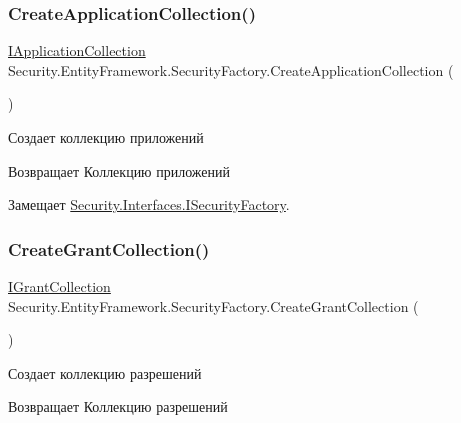 \subsubsection{\texorpdfstring{Create\+Application\+Collection()}{CreateApplicationCollection()}}
{\footnotesize\ttfamily \hyperlink{interface_security_1_1_interfaces_1_1_collections_1_1_i_application_collection}{I\+Application\+Collection} Security.\+Entity\+Framework.\+Security\+Factory.\+Create\+Application\+Collection (\begin{DoxyParamCaption}{ }\end{DoxyParamCaption})}



Создает коллекцию приложений 

\begin{DoxyReturn}{Возвращает}
Коллекцию приложений
\end{DoxyReturn}


Замещает \hyperlink{interface_security_1_1_interfaces_1_1_i_security_factory_a95eea08cd755ed6596a8896cb5c2910e}{Security.\+Interfaces.\+I\+Security\+Factory}.

\mbox{\label{class_security_1_1_entity_framework_1_1_security_factory_a63112a33e799949f653a7b3420bb5a83}} 
\subsubsection{\texorpdfstring{Create\+Grant\+Collection()}{CreateGrantCollection()}}
{\footnotesize\ttfamily \hyperlink{interface_security_1_1_interfaces_1_1_collections_1_1_i_grant_collection}{I\+Grant\+Collection} Security.\+Entity\+Framework.\+Security\+Factory.\+Create\+Grant\+Collection (\begin{DoxyParamCaption}{ }\end{DoxyParamCaption})}



Создает коллекцию разрешений 

\begin{DoxyReturn}{Возвращает}
Коллекцию разрешений
\end{DoxyReturn}


